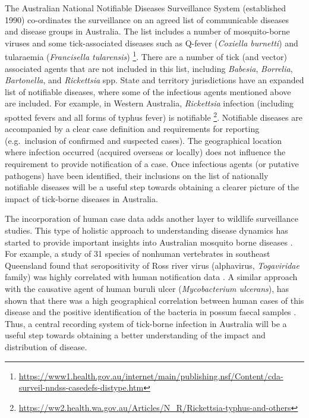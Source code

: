 \documentclass[a4paper, nobind]{templates/ociamthesis}
\begin{document}
The Australian National Notifiable Diseases Surveillance System (established 1990) co-ordinates the surveillance on an agreed list of communicable diseases and disease groups in Australia.
The list includes a number of mosquito-borne viruses and some tick-associated diseases such as Q-fever (\emph{Coxiella burnetti}) and tularaemia (\emph{Francisella tularensis}) \footnote{\url{https://www1.health.gov.au/internet/main/publishing.nsf/Content/cda-surveil-nndss-casedefs-distype.htm}}.
There are a number of tick (and vector) associated agents that are not included in this list, including \emph{Babesia}, \emph{Borrelia}, \emph{Bartonella}, and \emph{Rickettsia} spp.
State and territory jurisdictions have an expanded list of notifiable diseases, where some of the infectious agents mentioned above are included.
For example, in Western Australia, \emph{Rickettsia} infection (including spotted fevers and all forms of typhus fever) is notifiable \footnote{\url{https://ww2.health.wa.gov.au/Articles/N_R/Rickettsia-typhus-and-others}}.
Notifiable diseases are accompanied by a clear case definition and requirements for reporting (e.g.~inclusion of confirmed and suspected cases).
The geographical location where infection occurred (acquired overseas or locally) does not influence the requirement to provide notification of a case.
Once infectious agents (or putative pathogens) have been identified, their inclusions on the list of nationally notifiable diseases will be a useful step towards obtaining a clearer picture of the impact of tick-borne diseases in Australia.

The incorporation of human case data adds another layer to wildlife surveillance studies.
This type of holistic approach to understanding disease dynamics has started to provide important insights into Australian mosquito borne diseases \autocite{ongMosquitoBorneVirusesNonHuman2021}.
For example, a study of 31 species of nonhuman vertebrates in southeast Queensland found that seropositivity of Ross river virus (alphavirus, \emph{Togaviridae} family) was highly correlated with human notification data \autocite{skinnerSpeciesTraitsHotspots2020}.
A similar approach with the causative agent of human buruli ulcer (\emph{Mycobacterium ulcerans}), has shown that there was a high geographical correlation between human cases of this disease and the positive identification of the bacteria in possum faecal samples \autocite{carsonPotentialWildlifeSentinels2014}.
Thus, a central recording system of tick-borne infection in Australia will be a useful step towards obtaining a better understanding of the impact and distribution of disease.
\end{document}
